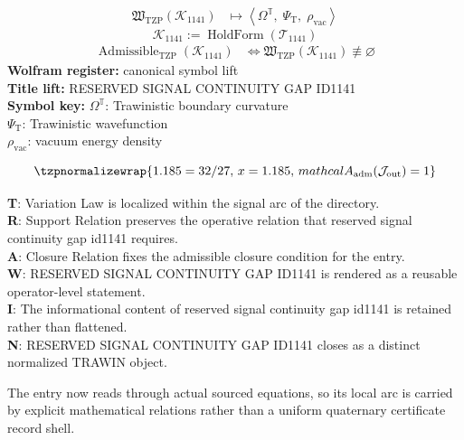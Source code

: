 \noindent
\begin{minipage}[t]{0.48\linewidth}
\begingroup
\small
\[
\begin{aligned}
\mathfrak{W}_{\mathrm{TZP}}\!\left(\mathcal{K}_{1141}\right)
&\longmapsto
\left\langle \Omega^{\mathbb{T}},\; \Psi_{\mathrm{T}},\; \rho_{\mathrm{vac}} \right\rangle
\end{aligned}
\]
\[
\mathcal{K}_{1141}
:=
\operatorname{HoldForm}\!\left(\mathcal{T}_{1141}\right)
\]
\[
\begin{aligned}
\operatorname{Admissible}_{\mathrm{TZP}}\!\left(\mathcal{K}_{1141}\right)
&\Longleftrightarrow
\mathfrak{W}_{\mathrm{TZP}}\!\left(\mathcal{K}_{1141}\right)\not\equiv\varnothing
\end{aligned}
\]
\textbf{Wolfram register:} canonical symbol lift\\
\textbf{Title lift:} RESERVED SIGNAL CONTINUITY GAP ID1141\\
\textbf{Symbol key:} \(\Omega^{\mathbb{T}}\): Trawinistic boundary curvature\\ \(\Psi_{\mathrm{T}}\): Trawinistic wavefunction\\ \(\rho_{\mathrm{vac}}\): vacuum energy density
\par
\endgroup
\end{minipage}\hfill
\begin{minipage}[t]{0.48\linewidth}
\[
\tzpnormalizewrap{1.185=32/27,\,x=1.185,\,mathcal{A}_{\mathrm{adm}}\!\left(\mathcal{J}_{\mathrm{out}}\right)=1}
\]

\small
\textbf{T}: Variation Law is localized within the signal arc of the directory.\\
\textbf{R}: Support Relation preserves the operative relation that reserved signal continuity gap id1141 requires.\\
\textbf{A}: Closure Relation fixes the admissible closure condition for the entry.\\
\textbf{W}: RESERVED SIGNAL CONTINUITY GAP ID1141 is rendered as a reusable operator-level statement.\\
\textbf{I}: The informational content of reserved signal continuity gap id1141 is retained rather than flattened.\\
\textbf{N}: RESERVED SIGNAL CONTINUITY GAP ID1141 closes as a distinct normalized TRAWIN object.
\normalsize
\end{minipage}

The entry now reads through actual sourced equations, so its local arc is carried by explicit mathematical relations rather than a uniform quaternary certificate record shell.
\clearpage

